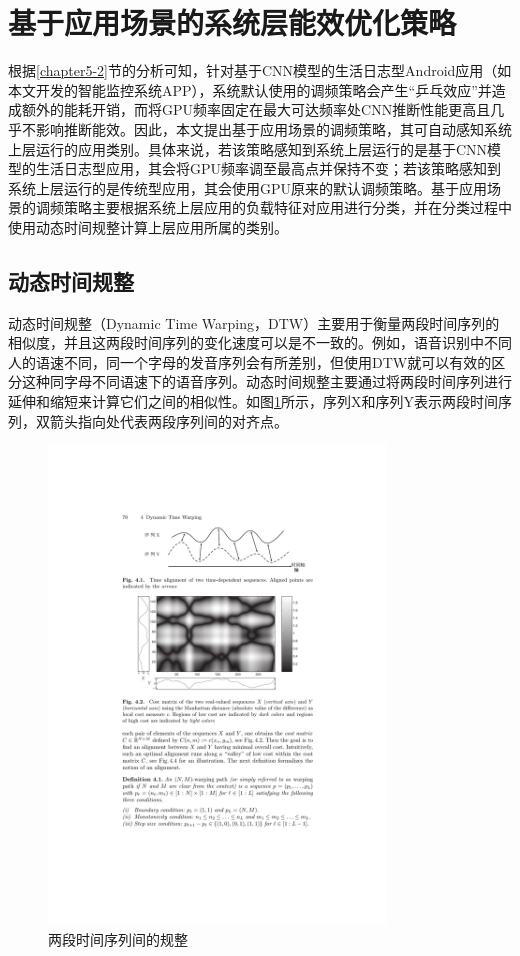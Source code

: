 \section{基于应用场景的系统层能效优化策略}
\label{chapter5-3}

根据\ref{chapter5-2}节的分析可知，针对基于CNN模型的生活日志型Android应用（如本文开发的智能监控系统APP），系统默认使用的调频策略会产生“乒乓效应”并造成额外的能耗开销，而将GPU频率固定在最大可达频率处CNN推断性能更高且几乎不影响推断能效。因此，本文提出基于应用场景的调频策略，其可自动感知系统上层运行的应用类别。具体来说，若该策略感知到系统上层运行的是基于CNN模型的生活日志型应用，其会将GPU频率调至最高点并保持不变；若该策略感知到系统上层运行的是传统型应用，其会使用GPU原来的默认调频策略。基于应用场景的调频策略主要根据系统上层应用的负载特征对应用进行分类，并在分类过程中使用动态时间规整计算上层应用所属的类别。

\subsection{动态时间规整}
\label{chapter5-3-1}
动态时间规整（Dynamic Time Warping，DTW）\cite{muller2007dynamic}主要用于衡量两段时间序列的相似度，并且这两段时间序列的变化速度可以是不一致的。例如，语音识别中不同人的语速不同，同一个字母的发音序列会有所差别，但使用DTW就可以有效的区分这种同字母不同语速下的语音序列。动态时间规整主要通过将两段时间序列进行延伸和缩短来计算它们之间的相似性。如图\ref{figure:figure39}所示，序列X和序列Y表示两段时间序列，双箭头指向处代表两段序列间的对齐点。

\begin{figure}[htbp]
    \centering
    \includegraphics[width=0.8\textwidth]{figures/dtw.pdf}
    \caption{两段时间序列间的规整}\label{figure:figure39}
\end{figure}


